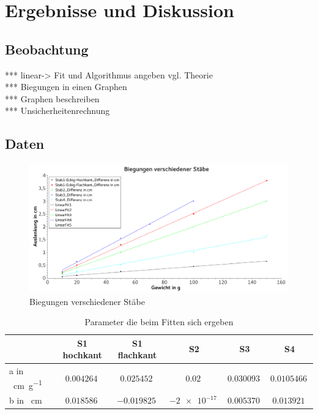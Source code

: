 \documentclass[
	a4paper,
	12pt,
	pagesize,
	ngerman
]{scrartcl}
\begin{document}
	\section{Ergebnisse und Diskussion}

	\subsection{Beobachtung}
	*** linear-> Fit und Algorithmus angeben vgl. Theorie\\
	*** Biegungen in einen Graphen \\
	*** Graphen beschreiben \\
	*** Unsicherheitenrechnung \\

	\subsection*{Daten}
	\begin{figure}[H]
		\includegraphics[width=1\textwidth]{Biegungen}
		\centering
		\caption{Biegungen verschiedener Stäbe}
		\label{BiegungGraph}
		\centering
	\end{figure}

	\begin{table}[H]
	\centering
	\begin{tabular}{ l | c | c | c | c | c |}
		& S1 hochkant  & S1 flachkant & S2 & S3 & S4  \\ \hline
		a in \SI{}{\centi\meter\per\gram} & $\SI{0,004264}{}$& $ \SI{0,025452}{}$&  $ \SI{0,02}{}$ & $\SI{0,030093}{}$ & $\SI{0,0105466}{}$  \\ \hline
		b in \SI{}{\centi\meter} & $\SI{0,018586}{}$  & $\SI{-0,019825}{}$  &  $\SI{-2e-17}{}$ &  $\SI{0,005370}{}$&  $\SI{0,013921}{}$   \\ \hline
	\end{tabular}
	\caption{Parameter die beim Fitten sich ergeben}
	\label{TabelleFits}
	\end{table}
\end{document}
